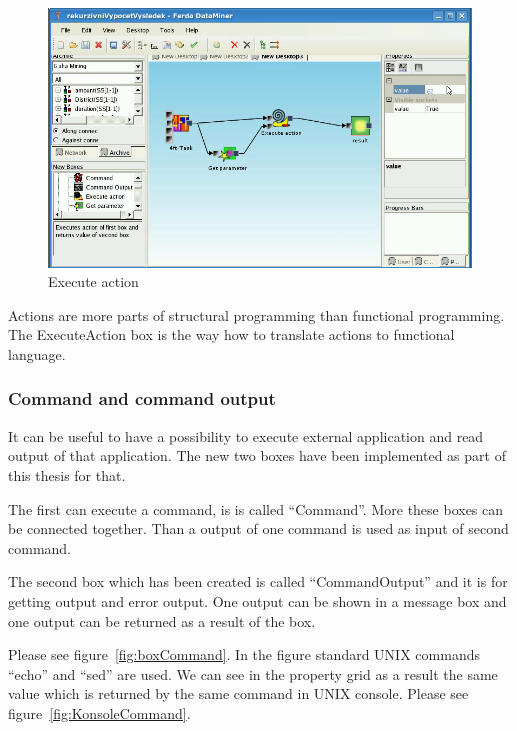 \documentclass[a4paper,12pt]{book}
\begin{document}
\begin{figure}
	\includegraphics[width=1\textwidth]{executeAction2.png}
	\caption{Execute action}
	\label{fig:boxExecuteAction}
\end{figure}

Actions are more parts of structural programming than functional programming. The ExecuteAction box is the way how to translate actions to functional language. 

\subsubsection{Command and command output}
It can be useful to have a possibility to execute external application and read output of that application. The new two boxes have been implemented as part of this thesis for that.

The first can execute a command, is is called ``Command''. More these boxes can be connected together. Than a output of one command is used as input of second command.

The second box which has been created is called ``CommandOutput'' and it is for getting output and error output. One output can be shown in a message box and one output can be returned as a result of the box.

Please see figure~\ref{fig:boxCommand}. In the figure standard UNIX commands ``echo'' and ``sed'' are used. We can see in the property grid as a result the same value which is returned by the same command in UNIX console. Please see figure~\ref{fig:KonsoleCommand}.
\end{document}
